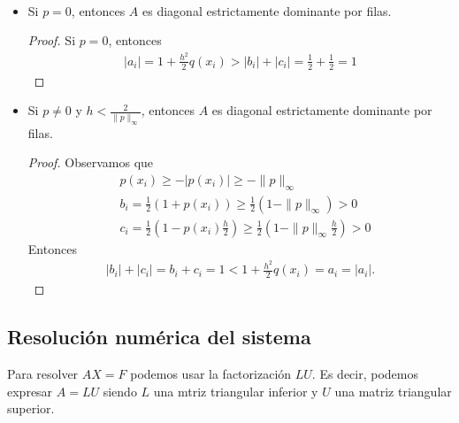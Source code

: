 \begin{ejemplo} \
    \begin{itemize}
        \item Si $p = 0$, entonces $A$ es diagonal estrictamente dominante por filas. \begin{proof}
                  Si $p = 0$, entonces
                  \begin{align*}
                      |a_i| = 1 + \frac{h^2}{2}q(x_i) > |b_i| + |c_i| = \frac{1}{2} + \frac{1}{2} = 1
                  \end{align*}
              \end{proof}
        \item Si $p \not = 0$ y $h < \frac{2}{\|p\|_{\infty}}$, entonces $A$ es diagonal estrictamente dominante por filas.
              \begin{proof}
                  Observamos que
                  \begin{align*}
                       & p(x_i) \ge -|p(x_i)| \ge - \|p\|_{\infty}                                                                             \\
                       & b_i = \frac{1}{2} \left(1 + p(x_i) \right) \ge \frac{1}{2} \left(1 - \|p\|_{\infty} \right) > 0                       \\
                       & c_i = \frac{1}{2} \left(1- p(x_i) \frac{h}{2} \right) \ge \frac{1}{2} \left(1 - \|p\|_{\infty}\frac{h}{2} \right) > 0
                  \end{align*}
                  Entonces
                  \begin{align*}
                      |b_i| + |c_i| = b_i + c_i = 1 < 1 + \frac{h^2}{2}q(x_i) = a_i = |a_i|.
                  \end{align*}
              \end{proof}
    \end{itemize}
\end{ejemplo}

\subsection{Resolución numérica del sistema}
Para resolver $AX = F$ podemos usar la factorización $LU$. Es decir, podemos expresar $A = LU$ siendo $L$ una mtriz triangular inferior y $U$ una matriz triangular superior.

